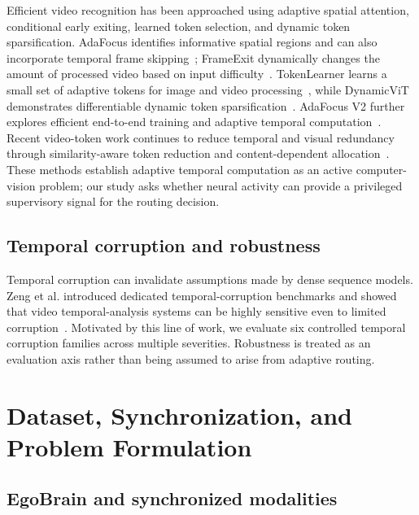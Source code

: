 \documentclass[runningheads]{llncs}
\begin{document}
Efficient video recognition has been approached using adaptive spatial attention, conditional early exiting, learned token selection, and dynamic token sparsification. AdaFocus identifies informative spatial regions and can also incorporate temporal frame skipping~\cite{wang2021adafocus}; FrameExit dynamically changes the amount of processed video based on input difficulty~\cite{ghodrati2021frameexit}. TokenLearner learns a small set of adaptive tokens for image and video processing~\cite{ryoo2021tokenlearner}, while DynamicViT demonstrates differentiable dynamic token sparsification~\cite{rao2021dynamicvit}. AdaFocus V2 further explores efficient end-to-end training and adaptive temporal computation~\cite{wang2022adafocusv2}. Recent video-token work continues to reduce temporal and visual redundancy through similarity-aware token reduction and content-dependent allocation~\cite{fu2025framefusion,li2026adaptok}. These methods establish adaptive temporal computation as an active computer-vision problem; our study asks whether neural activity can provide a privileged supervisory signal for the routing decision.

\subsection{Temporal corruption and robustness}

Temporal corruption can invalidate assumptions made by dense sequence models. Zeng et al. introduced dedicated temporal-corruption benchmarks and showed that video temporal-analysis systems can be highly sensitive even to limited corruption~\cite{zeng2024temporalrobustness}. Motivated by this line of work, we evaluate six controlled temporal corruption families across multiple severities. Robustness is treated as an evaluation axis rather than being assumed to arise from adaptive routing.

\section{Dataset, Synchronization, and Problem Formulation}

\subsection{EgoBrain and synchronized modalities}
\end{document}
